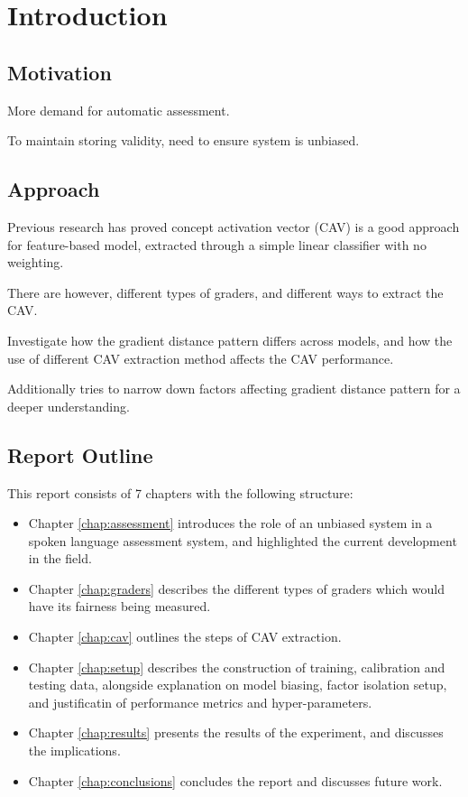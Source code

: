 \chapter{Introduction}

\section{Motivation}
More demand for automatic assessment.

To maintain storing validity, need to ensure system is unbiased.

\section{Approach}

Previous research has proved concept activation vector (CAV) 
is a good approach for feature-based model, extracted through a simple linear classifier with no weighting.

There are however, different types of graders, and different ways to extract the CAV.

Investigate how the gradient distance pattern differs across models, and how the use of different CAV extraction method affects the CAV performance.

Additionally tries to narrow down factors affecting gradient distance pattern for a deeper understanding.

\section{Report Outline}
This report consists of 7 chapters with the following structure:
\begin{itemize}
    \item Chapter \ref{chap:assessment} introduces the role of an unbiased system in a spoken language assessment system, and highlighted the current development in the field.
    \item Chapter \ref{chap:graders} describes the different types of graders which would have its fairness being measured.
    \item Chapter \ref{chap:cav} outlines the steps of CAV extraction.
    \item Chapter \ref{chap:setup} describes the construction of training, calibration and testing data, alongside explanation on model biasing, factor isolation setup, and justificatin of performance metrics and hyper-parameters.
    \item Chapter \ref{chap:results} presents the results of the experiment, and discusses the implications.
    \item Chapter \ref{chap:conclusions} concludes the report and discusses future work.
\end{itemize}